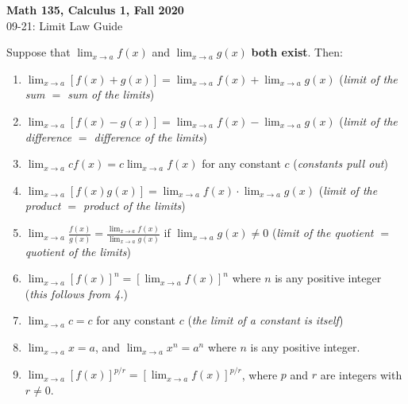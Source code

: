 \documentclass[11pt,reqno,final]{amsart}
\makeatletter
\let\sqrt=\undefined
\DeclareRobustCommand\sqrt{\@ifnextchar[\@sqrt{\mathpalette\@x@sqrt}]}
\def\@x@sqrt#1#2{%
 \setbox\z@\hbox{$\m@th#1\sqrtsign{\mkern1mu #2}$}
 \mkern3mu\box\z@}
\numberwithin{equation}{section}
\numberwithin{figure}{section}
\theoremstyle{definition} %
\makeatother
\begin{document}
\onehalfspacing

\begin{center}
        \textbf{\Large Math 135, Calculus 1, Fall 2020}\\[10pt]
        {\large 09-21: Limit Law Guide}
\end{center}

\thispagestyle{empty}

\renewcommand{\thesection}{\Alph{section}}

Suppose that $\displaystyle \lim_{x\to a} f(x)$ and $\displaystyle \lim_{x\to a}g(x)$ \textbf{both exist}. Then:\\
\begin{enumerate}[1.]\itemsep+15pt
\item $\displaystyle \lim_{x\to a}[f(x)+g(x)]=\lim_{x\to a}f(x)+\lim_{x\to a}g(x)$  \quad ({\em limit of the sum $=$ sum of the limits})
\item $\displaystyle \lim_{x\to a}[f(x)-g(x)]=\lim_{x\to a}f(x)-\lim_{x\to a}g(x)$  
\quad ({\em limit of the difference $=$ difference of the limits})
\item $\displaystyle \lim_{x\to a}cf(x)=c\lim_{x\to a}f(x)$ for any constant $c$  \quad  ({\em constants pull out})
\item $\displaystyle \lim_{x\to a}[f(x)g(x)]=\lim_{x\to a}f(x)\cdot\lim_{x\to a}g(x)$  \quad ({\em limit of the product $=$ product of the limits})
\item $\displaystyle \lim_{x\to a}\frac{f(x)}{g(x)}=\frac{\displaystyle\lim_{x\to a}f(x)}{\displaystyle\lim_{x\to a}g(x)}$
if $\displaystyle \lim_{x\to a}g(x)\neq0$  \quad ({\em limit of the quotient $=$ quotient of the limits})
\item $\displaystyle \lim_{x\to a}\left[f(x)\right]^n=\left[\lim_{x\to a}f(x)\right]^n$
where $n$ is any positive integer   \quad  ({\em this follows from 4.})
\item $\displaystyle \lim_{x\to a} c =c$ for any constant $c$  \quad ({\em the limit of a constant is itself})
\item $\displaystyle \lim_{x\to a} x = a$, and $\displaystyle \lim_{x\to a} x^n = a^n$ where $n$ is any positive integer.
\item $\displaystyle \lim_{x\to a} [f(x)]^{p/r} = [\lim_{x\to a} f(x)]^{p/r}$, where $p$ and $r$ are integers with $r \neq 0$.
\end{enumerate}
\end{document}
